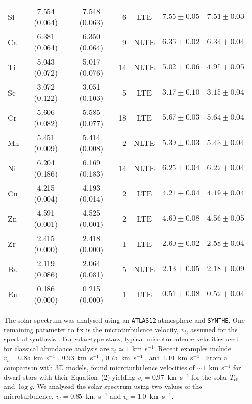 \documentclass{aa}
\begin{document}
\begin{table*}
\begin{tabular}{l c c r c c c}
Si & 7.554 (0.064) & 7.548 (0.063) &  6 &  LTE & $7.55\pm0.05$ & $7.51\pm0.03$\\
Ca & 6.381 (0.064) & 6.350 (0.064) &  9 & NLTE & $6.36\pm0.02$ & $6.34\pm0.04$\\
Ti & 5.043 (0.072) & 5.017 (0.076) & 14 & NLTE & $5.02\pm0.06$ & $4.95\pm0.05$\\
Sc & 3.072 (0.122) & 3.051 (0.103) &  5 &  LTE & $3.17\pm0.10$ & $3.15\pm0.04$\\
Cr & 5.606 (0.082) & 5.585 (0.077) & 18 &  LTE & $5.67\pm0.03$ & $5.64\pm0.04$\\
Mn & 5.451 (0.009) & 5.414 (0.008) &  2 & NLTE & $5.39\pm0.03$ & $5.43\pm0.04$\\
Ni & 6.204 (0.186) & 6.169 (0.183) & 14 & NLTE & $6.25\pm0.04$ & $6.22\pm0.04$\\
Cu & 4.215 (0.004) & 4.193 (0.014) &  2 &  LTE & $4.21\pm0.04$ & $4.19\pm0.04$\\
Zn & 4.591 (0.001) & 4.525 (0.001) &  2 &  LTE & $4.60\pm0.08$ & $4.56\pm0.05$\\
Zr & 2.415 (0.000) & 2.418 (0.000) &  1 &  LTE & $2.60\pm0.02$ & $2.58\pm0.04$\\
Ba & 2.119 (0.086) & 2.064 (0.081) &  5 & NLTE & $2.13\pm0.05$ & $2.18\pm0.09$\\
Eu & 0.186 (0.000) & 0.215 (0.000) &  1 &  LTE & $0.51\pm0.08$ & $0.52\pm0.04$\\
\hline
\end{tabular}
\end{table*}


The solar spectrum was analysed using an \texttt{ATLAS12} atmosphere and \texttt{SYNTHE}. One remaining parameter to fix is the microturbulence velocity, $v_t$, assumed for the spectral synthesis \citep[e.g.][]{Jefferies1968}. For solar-type stars, typical microturbulence velocities used for classical abundance analysis are $v_t\simeq1$~km~s$^{-1}$.  Recent examples include $v_t=0.85$~km~s$^{-1}$ \citep{Valenti2005,Yong2005,Brewer2015},   0.93~km~s$^{-1}$ \citep{Fulbright2006}, 
0.75~km~s$^{-1}$ \citep{Pavlenko2012}, and $1.10$~km~s$^{-1}$ \citep{Laverick2019}. From a comparison with 3D models, \citet{Dutra-Ferreira2016} found microturbulence velocities of $\sim1$~km~s$^{-1}$ for dwarf stars with their Equation~(2) yielding $v_t = 0.97$~km~s$^{-1}$ for the solar $T_\mathrm{eff}$ and $\log g$. We analysed the solar spectrum using two values of the microturbulence, $v_t=0.85$~km~s$^{-1}$ and $v_t=1.0$~km~s$^{-1}$.
\end{document}
